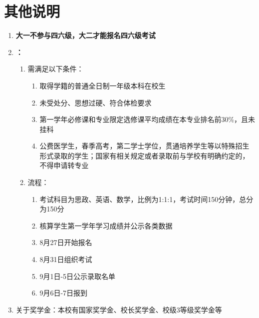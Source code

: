 \section[其他说明]{其他说明}
\begin{enumerate}
    \item \textbf{大一不参与四六级，大二才能报名四六级考试}
    \item \textbf{\footnotemark：}
          \begin{enumerate}
              \item 需满足以下条件：
                    \begin{enumerate}
                        \item 取得学籍的普通全日制一年级本科在校生
                        \item 未受处分、思想过硬、符合体检要求
                        \item 第一学年必修课和专业限定选修课平均成绩在本专业排名前30\%，且未挂科
                        \item 公费医学生，春季高考，第二学士学位，贯通培养学生等以特殊招生形式录取的学生；国家有相关规定或者录取前与学校有明确约定的，不得申请转专业
                    \end{enumerate}
              \item 流程：
                    \begin{enumerate}
                        \item 考试科目为思政、英语、数学，比例为1:1:1，考试时间150分钟，总分为150分
                        \item 核算学生第一学年学习成绩并公示各类数据
                        \item 8月27日开始报名
                        \item 8月31日组织考试
                        \item 9月1日-5日公示录取名单\footnotemark
                        \item 9月6日-7日报到
                    \end{enumerate}
          \end{enumerate}
    \item 关于奖学金\footnotemark：本校有国家奖学金、校长奖学金、校级3等级奖学金等

\end{enumerate}
